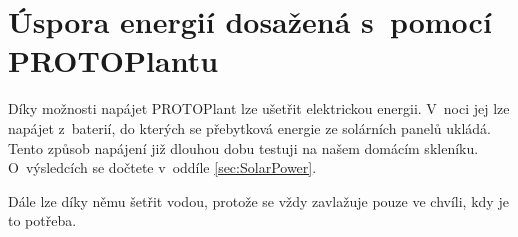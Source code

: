 \chapter{Úspora energií dosažená s~pomocí PROTOPlantu}
Díky možnosti napájet PROTOPlant  lze ušetřit elektrickou energii. 
V~noci jej lze napájet z~baterií, do kterých se přebytková energie ze solárních panelů ukládá.
Tento způsob napájení již dlouhou dobu testuji na našem domácím skleníku. 
O~výsledcích se dočtete v~oddíle \ref{sec:SolarPower}.

Dále lze díky němu šetřit vodou, protože se vždy zavlažuje pouze ve chvíli, kdy je to potřeba.

\newpage